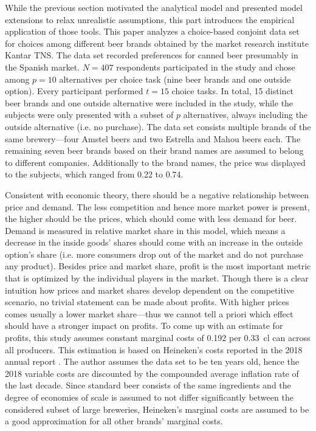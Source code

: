 \documentclass[12pt,a4paper]{article}
\begin{document}
While the previous section motivated the analytical model and presented model extensions to relax unrealistic assumptions,
this part introduces the empirical application of those tools.
This paper analyzes a choice-based conjoint data set for choices among different beer brands obtained by the market research institute Kantar TNS.
The data set recorded preferences for canned beer presumably in the Spanish market.
 $N=407$ respondents participated in the study and chose among $p=10$ alternatives per choice task (nine beer brands and one outside option).
Every participant performed $t=15$ choice tasks. In total, 15 distinct beer brands and one outside alternative were included in the study,
while the subjects were only presented with a subset of $p$ alternatives, always including the outside alternative (i.e. no purchase).
The data set consists multiple brands of the same brewery---four Amstel beers and two Estrella and Mahou beers each.
The remaining seven beer brands based on their brand names are assumed to belong to different companies.
Additionally to the brand names, the price was displayed to the subjects, which ranged from 0.22 to 0.74\text{ \euro }.

Consistent with economic theory, there should be a negative relationship between price and demand.
The less competition and hence more market power is present, the higher should be the prices, which should come with less demand for beer.
Demand is measured in relative market share in this model, which means a decrease in the inside goods' shares should come with an increase in the outside option's share (i.e. more consumers drop out of the market and do not purchase any product).
Besides price and market share, profit is the most important metric that is optimized by the individual players in the market.
Though there is a clear intuition how prices and market shares develop dependent on the competitive scenario, no trivial statement can be made about profits.
With higher prices comes usually a lower market share---thus we cannot tell a priori which effect should have a stronger impact on profits.
To come up with an estimate for profits, this study assumes constant marginal costs of 0.192\text{ \euro } per 0.33~cl can across all producers.
This estimation is based on Heineken's costs reported in the 2018 annual report \citep{heinekenHeinekenAnnualReport2019}. 
The author assumes the data set to be ten years old, hence the 2018 variable costs are discounted by the compounded average inflation rate of the last decade.
Since standard beer consists of the same ingredients and the degree of economies of scale is assumed to not differ significantly between the considered subset of large breweries, Heineken's marginal costs are assumed to be a good approximation for all other brands' marginal costs.
\end{document}
